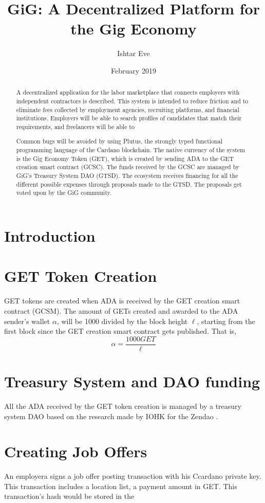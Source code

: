 \documentclass{article}
\title{GiG: A Decentralized Platform for the Gig Economy}
\author{Ishtar Eve}
\date{February 2019}
\begin{document}
   \maketitle
   \begin{abstract}
A decentralized application for the labor marketplace that connects employers with independent contractors is described. This system is intended to reduce friction and to eliminate fees collected by employment agencies, recruiting platforms, and financial institutions. Employers will be able to search profiles of candidates that match their requirements, and freelancers will be able to 


Common bugs will be avoided by using Plutus, the strongly typed functional programming language of the Cardano blockchain.
The native currency of the system is the Gig Economy Token (GET), which is created by sending ADA to the GET creation smart contract (GCSC). The funds received by the GCSC are managed by GiG's Treasury System DAO (GTSD). 
The ecosystem receives financing for all the different possible expenses through proposals made to the GTSD. The proposals get voted upon by the GiG community.
\end{abstract}

\section{Introduction}   


\section{GET Token Creation}
GET tokens are created when ADA is received by the GET creation smart contract (GCSM).
The amount of GETs created and awarded to the ADA sender's wallet $\alpha$, will be 1000 divided by the block height $\ell$, starting from the first block since the GET creation smart contract gets published. That is,
\[ \alpha
  = \dfrac{1000 GET}{\ell}
\]

\section{Treasury System and DAO funding}
All the ADA received by the GET token creation is managed by a treasury system DAO based on the research made by IOHK for the Zendao \cite{zhangb2}.
 
\section{Creating Job Offers}
An employera signs a job offer posting transaction with his Ccardano private key. This transaction includes a location list, a payment amount in GET. This transaction's hash would be stored in the 
\end{document}
